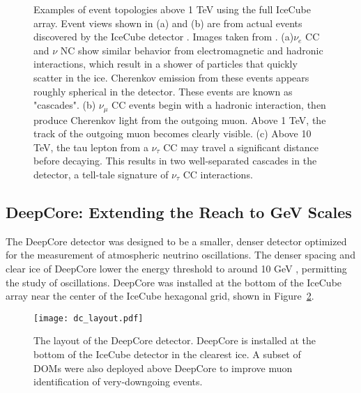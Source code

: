 \begin{figure} 
\centering
    
    
\caption{Examples of event topologies above 1 TeV using the full IceCube array. Event views shown in (a) and (b) are from actual events discovered by the IceCube detector \cite{IceCube-AstroNu}. Images taken from \cite{Thesis-Euler}. (a)$\nu_e$ CC and $\nu$ NC show similar behavior from electromagnetic and hadronic interactions, which result in a shower of particles that quickly scatter in the ice. Cherenkov emission from these events appears roughly spherical in the detector. These events are known as "cascades". (b) $\nu_\mu$ CC events begin with a hadronic interaction, then produce Cherenkov light from the outgoing muon. Above 1 TeV, the track of the outgoing muon becomes clearly visible. (c) Above 10 TeV, the tau lepton from a $\nu_\tau$ CC may travel a significant distance before decaying. This results in two well-separated cascades in the detector, a tell-tale signature of $\nu_\tau$ CC interactions.}
\label{fig:icecube_he_events}
\end{figure}

\label{subsec:deepcore}
\subsection{DeepCore: Extending the Reach to GeV Scales}
The DeepCore detector was designed to be a smaller, denser detector optimized for the measurement of atmospheric neutrino oscillations.
The denser spacing and clear ice of DeepCore lower the energy threshold to around 10 GeV \cite{Description-DeepCore}, permitting the study of oscillations.
DeepCore was installed at the bottom of the IceCube array near the center of the IceCube hexagonal grid, shown in Figure~\ref{fig:deepcore_layout}.

\begin{figure}
\centering
\texttt{[image: dc\_layout.pdf]} 
\caption{The layout of the DeepCore detector. DeepCore is installed at the bottom of the IceCube detector in the clearest ice. A subset of DOMs were also deployed above DeepCore to improve muon identification of very-downgoing events.}
\label{fig:deepcore_layout}
\end{figure}

